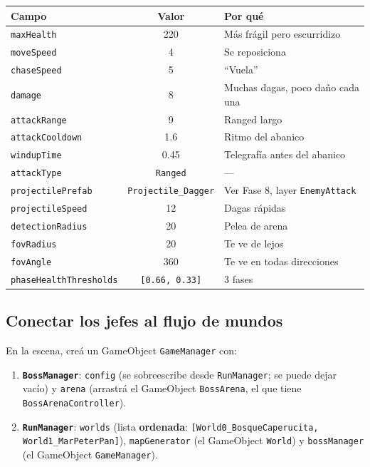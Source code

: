 \documentclass[a4paper,12pt]{article}
\newcommand{\code}[1]{\texttt{#1}}
\begin{document}
\begin{center}
\begin{longtable}{|l|c|p{6.6cm}|}
\hline
\textbf{Campo} & \textbf{Valor} & \textbf{Por qué} \\
\hline
\endhead
\code{maxHealth} & 220 & Más frágil pero escurridizo \\
\hline
\code{moveSpeed} & 4 & Se reposiciona \\
\hline
\code{chaseSpeed} & 5 & ``Vuela'' \\
\hline
\code{damage} & 8 & Muchas dagas, poco daño cada una \\
\hline
\code{attackRange} & 9 & Ranged largo \\
\hline
\code{attackCooldown} & 1.6 & Ritmo del abanico \\
\hline
\code{windupTime} & 0.45 & Telegrafía antes del abanico \\
\hline
\code{attackType} & \code{Ranged} & --- \\
\hline
\code{projectilePrefab} & \code{Projectile\_Dagger} & Ver Fase 8, layer \code{EnemyAttack} \\
\hline
\code{projectileSpeed} & 12 & Dagas rápidas \\
\hline
\code{detectionRadius} & 20 & Pelea de arena \\
\hline
\code{fovRadius} & 20 & Te ve de lejos \\
\hline
\code{fovAngle} & 360 & Te ve en todas direcciones \\
\hline
\code{phaseHealthThresholds} & \code{[0.66, 0.33]} & 3 fases \\
\hline
\end{longtable}
\end{center}

\subsection{Conectar los jefes al flujo de mundos}

En la escena, creá un GameObject \code{GameManager} con:

\begin{enumerate}
    \item \textbf{\code{BossManager}}: \code{config} (se sobreescribe desde \code{RunManager};
    se puede dejar vacío) y \code{arena} (arrastrá el GameObject \code{BossArena}, el que tiene
    \code{BossArenaController}).
    \item \textbf{\code{RunManager}}: \code{worlds} (lista \textbf{ordenada}:
    \code{[World0\_BosqueCaperucita, World1\_MarPeterPan]}), \code{mapGenerator} (el GameObject
    \code{World}) y \code{bossManager} (el GameObject \code{GameManager}).
\end{enumerate}
\end{document}
